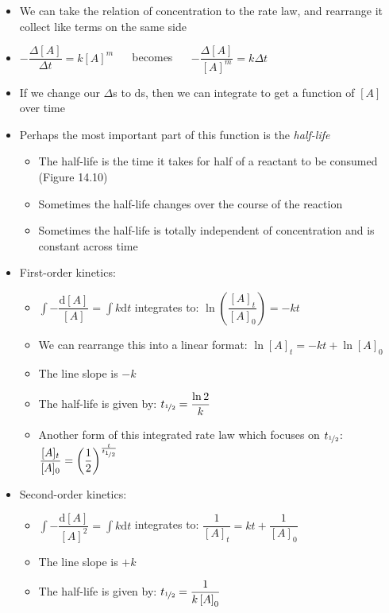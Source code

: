 \documentclass[12pt, openany, letterpaper]{memoir}
\begin{document}
\begin{itemize}
	\item We can take the relation of concentration to the rate law, and rearrange it collect like terms on the same side
	\item $-\dfrac{\Delta \left[A\right]}{\Delta t} = k\left[A\right]^m$ ~~ becomes ~~ $-\dfrac{\Delta \left[A\right]}{\left[A\right]^m} = k\Delta t$
	\item If we change our $\Delta$s to $\mathrm{d}$s, then we can integrate to get a function of $\left[A\right]$ over time
	\item Perhaps the most important part of this function is the \emph{half-life}
	\begin{itemize}
		\item The half-life is the time it takes for half of a reactant to be consumed (Figure 14.10)
		\item Sometimes the half-life changes over the course of the reaction
		\item Sometimes the half-life is totally independent of concentration and is constant across time
	\end{itemize}
	\item First-order kinetics:
	\begin{itemize}
		\item $\int-\dfrac{\mathrm{d} \left[A\right]}{\left[A\right]} = \int k\mathrm{d} t$ integrates to: $\ln\left(\dfrac{[A]_t}{[A]_0}\right) = -kt$
		\item We can rearrange this into a linear format: $\ln \left[A\right]_t = -kt + \ln\left[A\right]_0$
		\item The line slope is $-k$
		\item The half-life is given by: $t_{\nicefrac{1}{2}}=\dfrac{\ln 2}{k}$ 
    \item Another form of this integrated rate law which focuses on $t_{\nicefrac{1}{2}}$: 
      $\dfrac{[A]_t}{[A]_0} = \left(\dfrac{1}{2}\right)^{\frac{t}{t_{\nicefrac{1}{2}}}}$
	\end{itemize}
	\item Second-order kinetics:
	\begin{itemize}
		\item $\int-\dfrac{\mathrm{d} \left[A\right]}{\left[A\right]^2} = \int k\mathrm{d} t$ integrates to: $\dfrac{1}{[A]_t} = kt + \dfrac{1}{[A]_0}$
		\item The line slope is $+k$
		\item The half-life is given by: $t_{\nicefrac{1}{2}}=\dfrac{1}{k\left[A\right]_0}$ 

\end{itemize}
\end{itemize}
\end{document}
